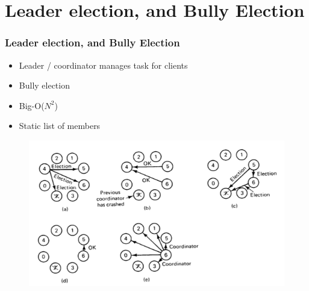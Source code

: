 \documentclass{beamer}
\begin{document}
\section{Leader election, and Bully Election}
	\begin{frame}
		\frametitle{Leader election, and Bully Election}
		
		\begin{itemize}
		\item Leader / coordinator manages task for clients
		\item Bully election
		\item Big-O($N^2$)
		\item Static list of members
		\end{itemize}
		
		\begin{figure}[hbtp]
		\centering
		\includegraphics[scale=0.5]{BullyAlgorithm}
		\end{figure}		
				
	\end{frame}
	
\end{document}
